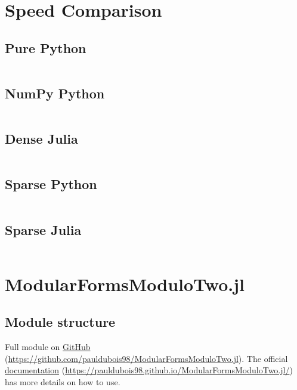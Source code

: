 
\section{Speed Comparison}
\subsection{Pure Python}
\label{code:PurePython}
\inputminted[lastline=19]{python}{SpeedComparison/PurePython.py}

\subsection{NumPy Python}
\label{code:NumPyPython}
\inputminted[lastline=21]{python}{SpeedComparison/NumPyPython.py}

\subsection{Dense Julia}
\label{code:DenseJulia}
\inputminted[lastline=24]{julia}{SpeedComparison/DenseJulia.jl}

\subsection{Sparse Python}
\label{code:SparsePython}
\inputminted[lastline=18]{python}{SpeedComparison/SparsePython.py}

\subsection{Sparse Julia}
\label{code:SparseJulia}
\inputminted[lastline=24]{julia}{SpeedComparison/SparseJulia.jl}





\section{ModularFormsModuloTwo.jl}
\subsection[Files Tree]{Module structure}
Full module on \href{https://github.com/pauldubois98/ModularFormsModuloTwo.jl}{GitHub} (\url{https://github.com/pauldubois98/ModularFormsModuloTwo.jl}).
The official \href{https://pauldubois98.github.io/ModularFormsModuloTwo.jl/}{documentation} (\url{https://pauldubois98.github.io/ModularFormsModuloTwo.jl/}) has more details on how to use.

